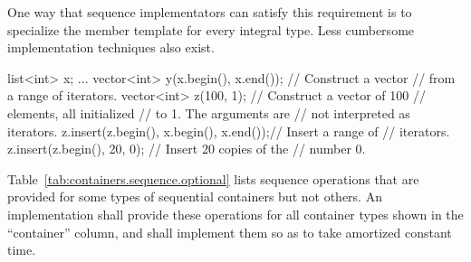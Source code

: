 \pnum
One way that sequence implementators can satisfy this requirement is to
specialize the member template for every integral type. Less cumbersome
implementation techniques also exist.
\exitnoteb
\enterexample

\begin{codeblock}
list<int> x;
...
vector<int> y(x.begin(), x.end());      // Construct a vector
                                        // from a range of iterators.
vector<int> z(100, 1);                  // Construct a vector of 100
                                        // elements, all initialized
                                        // to 1. The arguments are
                                        // not interpreted as iterators.
z.insert(z.begin(), x.begin(), x.end());// Insert a range of
                                        // iterators.
z.insert(z.begin(), 20, 0);             // Insert 20 copies of the
                                        // number 0.
\end{codeblock}

\exitexampleb

\pnum
Table~\ref{tab:containers.sequence.optional} lists sequence operations
that are provided for some types of
sequential containers but not others.
An implementation shall provide
these operations for all container types shown in the ``container''
column, and shall implement them so as to take amortized constant
time.

